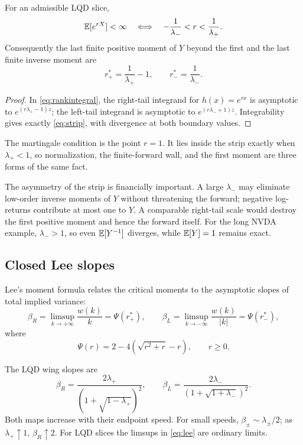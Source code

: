 \begin{proposition}
\label{prop:strip}
For an admissible LQD slice,
\begin{equation}
\mathbb{E}[e^{rX}]<\infty
\quad\Longleftrightarrow\quad
-\frac1{\lambda_-}<r<\frac1{\lambda_+}.
\label{eq:strip}
\end{equation}
Consequently the last finite positive moment of $Y$ beyond the first and the
last finite inverse moment are
\[
r_+^*=\frac1{\lambda_+}-1,
\qquad
r_-^*=\frac1{\lambda_-}.
\]
\end{proposition}

\begin{proof}
In \eqref{eq:rankintegral}, the right-tail integrand for $h(x)=e^{rx}$ is
asymptotic to $e^{(r\lambda_+-1)z}$; the left-tail integrand is asymptotic to
$e^{(r\lambda_-+1)z}$.  Integrability gives exactly
\eqref{eq:strip}, with divergence at both boundary values.
\end{proof}

The martingale condition is the point $r=1$.  It lies inside the strip exactly
when $\lambda_+<1$, so normalization, the finite-forward wall, and the first
moment are three forms of the same fact.

The asymmetry of the strip is financially important.  A large $\lambda_-$
may eliminate low-order inverse moments of $Y$ without threatening the
forward; negative log-returns contribute at most one to $Y$.  A comparable
right-tail scale would destroy the first positive moment and hence the
forward itself.  For the long NVDA example, $\lambda_->1$, so even
$\mathbb{E}[Y^{-1}]$ diverges, while $\mathbb{E}[Y]=1$ remains exact.

\subsection{Closed Lee slopes}

Lee's moment formula \citep{Lee2004} relates the critical moments to the
asymptotic slopes of total implied variance:
\begin{equation}
\beta_R=\limsup_{k\to+\infty}\frac{w(k)}k=\Psi(r_+^*),
\qquad
\beta_L=\limsup_{k\to-\infty}\frac{w(k)}{|k|}=\Psi(r_-^*),
\label{eq:lee}
\end{equation}
where
\[
\Psi(r)=2-4(\sqrt{r^2+r}-r),\qquad r\ge0.
\]

\begin{proposition}
\label{prop:leeclosed}
The LQD wing slopes are
\begin{equation}
\beta_R=\frac{2\lambda_+}{(1+\sqrt{1-\lambda_+})^2},
\qquad
\beta_L=\frac{2\lambda_-}{(1+\sqrt{1+\lambda_-})^2}.
\label{eq:leeclosed}
\end{equation}
Both maps increase with their endpoint speed.  For small speeds,
$\beta_\pm\sim\lambda_\pm/2$; as $\lambda_+\uparrow1$, $\beta_R\uparrow2$.
For LQD slices the limsups in \eqref{eq:lee} are ordinary limits.
\end{proposition}

